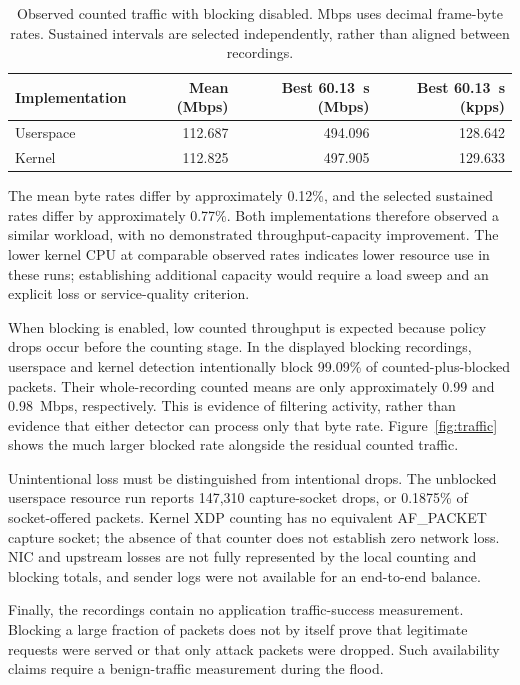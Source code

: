 \begin{table}[H]
    \centering
    \small
    \begin{tabular}{lrrr}
        \toprule
        Implementation & Mean (Mbps) & Best 60.13~s (Mbps) & Best 60.13~s (kpps) \\
        \midrule
        Userspace & 112.687 & 494.096 & 128.642 \\
        Kernel & 112.825 & 497.905 & 129.633 \\
        \bottomrule
    \end{tabular}
    \caption{Observed counted traffic with blocking disabled. Mbps uses decimal frame-byte rates. Sustained intervals are selected independently, rather than aligned between recordings.}
    \label{tab:throughput}
\end{table}

The mean byte rates differ by approximately 0.12\%, and the selected sustained rates differ by approximately 0.77\%. Both implementations therefore observed a similar workload, with no demonstrated throughput-capacity improvement. The lower kernel CPU at comparable observed rates indicates lower resource use in these runs; establishing additional capacity would require a load sweep and an explicit loss or service-quality criterion.

When blocking is enabled, low counted throughput is expected because policy drops occur before the counting stage. In the displayed blocking recordings, userspace and kernel detection intentionally block 99.09\% of counted-plus-blocked packets. Their whole-recording counted means are only approximately 0.99 and 0.98~Mbps, respectively. This is evidence of filtering activity, rather than evidence that either detector can process only that byte rate. Figure~\ref{fig:traffic} shows the much larger blocked rate alongside the residual counted traffic.

Unintentional loss must be distinguished from intentional drops. The unblocked userspace resource run reports 147,310 capture-socket drops, or 0.1875\% of socket-offered packets. Kernel XDP counting has no equivalent AF\_PACKET capture socket; the absence of that counter does not establish zero network loss. NIC and upstream losses are not fully represented by the local counting and blocking totals, and sender logs were not available for an end-to-end balance.

Finally, the recordings contain no application traffic-success measurement. Blocking a large fraction of packets does not by itself prove that legitimate requests were served or that only attack packets were dropped. Such availability claims require a benign-traffic measurement during the flood.


